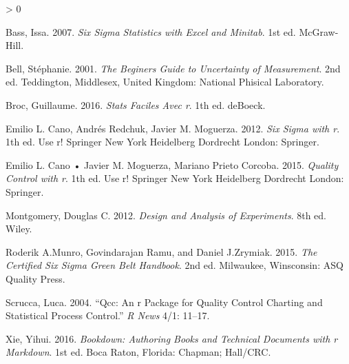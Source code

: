 \documentclass[
]{book}
\newlength{\cslhangindent}
\newenvironment{CSLReferences}[2] %
 {%
  \setlength{\parindent}{0pt}
  \ifodd #1 \everypar{\setlength{\hangindent}{\cslhangindent}}\ignorespaces\fi
  \ifnum #2 > 0
  \setlength{\parskip}{#2\baselineskip}
  \fi
 }%
 {}
\begin{document}
\hypertarget{refs}{}
\begin{CSLReferences}{1}{0}
\leavevmode\hypertarget{ref-Bass2007}{}%
Bass, Issa. 2007. \emph{Six Sigma Statistics with Excel and Minitab}. 1st ed. McGraw-Hill.

\leavevmode\hypertarget{ref-Bell2001}{}%
Bell, Stéphanie. 2001. \emph{The Beginers Guide to Uncertainty of Measurement}. 2nd ed. Teddington, Middlesex, United Kingdom: National Phisical Laboratory.

\leavevmode\hypertarget{ref-Broc2016}{}%
Broc, Guillaume. 2016. \emph{Stats Faciles Avec r}. 1th ed. deBoeck.

\leavevmode\hypertarget{ref-Cano2012}{}%
Emilio L. Cano, Andrés Redchuk, Javier M. Moguerza. 2012. \emph{Six Sigma with r}. 1th ed. Use r! Springer New York Heidelberg Dordrecht London: Springer.

\leavevmode\hypertarget{ref-Cano2015}{}%
Emilio L. Cano • Javier M. Moguerza, Mariano Prieto Corcoba. 2015. \emph{Quality Control with r}. 1th ed. Use r! Springer New York Heidelberg Dordrecht London: Springer.

\leavevmode\hypertarget{ref-Montgomery2012}{}%
Montgomery, Douglas C. 2012. \emph{Design and Analysis of Experiments}. 8th ed. Wiley.

\leavevmode\hypertarget{ref-Munro2015}{}%
Roderik A.Munro, Govindarajan Ramu, and Daniel J.Zrymiak. 2015. \emph{The Certified Six Sigma Green Belt Handbook}. 2nd ed. Milwaukee, Winsconsin: ASQ Quality Press.

\leavevmode\hypertarget{ref-Scrucca2004}{}%
Scrucca, Luca. 2004. {``Qcc: An r Package for Quality Control Charting and Statistical Process Control.''} \emph{R News} 4/1: 11--17.

\leavevmode\hypertarget{ref-Xie2016}{}%
Xie, Yihui. 2016. \emph{Bookdown: Authoring Books and Technical Documents with r Markdown}. 1st ed. Boca Raton, Florida: Chapman; Hall/CRC.

\end{CSLReferences}
\end{document}
